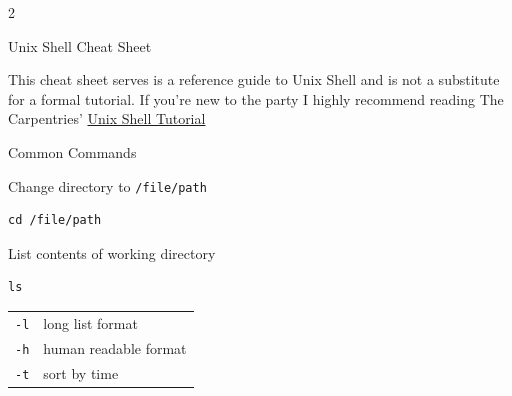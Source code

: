 \documentclass[10pt]{article}
\newcommand{\code}[1]{\texttt{#1}}
\begin{document}
\begin{multicols*}{2}

\begin{center}
     \Large{Unix Shell Cheat Sheet}
\end{center}

This cheat sheet serves is a reference guide to Unix Shell and is not a substitute for a formal tutorial. If you're new to the party I highly recommend reading The Carpentries' \href{https://swcarpentry.github.io/shell-novice/}{Unix Shell Tutorial} 

\begin{center}
     \Large{Common Commands}
\end{center}

Change directory to \code{/file/path}
\begin{lstlisting}
cd /file/path 
\end{lstlisting}

List contents of working directory
\begin{lstlisting}
ls 
\end{lstlisting}

\begin{center}
    \begin{tabular}{|p{80pt}p{150pt}|}
    \hline
    \code{-l} & long list format \\
    \rowcolor{yellow}
    \code{-h} & human readable format \\
    \code{-t} & sort by time  \\
    \hline
    \end{tabular}
\end{center}
 
\end{multicols*}
\end{document}
